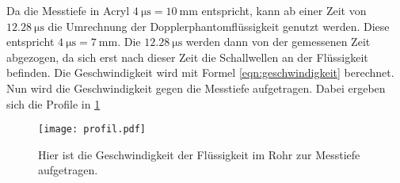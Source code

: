 Da die Messtiefe in Acryl $\qty{4}{\micro\second}=\qty{10}{\milli\meter}$ entspricht, kann ab einer Zeit von $\qty{12.28}{\micro\second}$ die Umrechnung der Dopplerphantomflüssigkeit genutzt werden.
Diese entspricht $\qty{4}{\micro\second}=\qty{7}{\milli\meter}$.
Die $\qty{12.28}{\micro\second}$ werden dann von der gemessenen Zeit abgezogen, da sich erst nach dieser Zeit die Schallwellen an der Flüssigkeit befinden.
Die Geschwindigkeit wird mit Formel \ref{eqn:geschwindigkeit} berechnet.
Nun wird die Geschwindigkeit gegen die Messtiefe aufgetragen.
Dabei ergeben sich die Profile in \ref{fig:Profile}
\begin{figure}
  \centering
  \texttt{[image: profil.pdf]}
  \caption{Hier ist die Geschwindigkeit der Flüssigkeit im Rohr zur Messtiefe aufgetragen.}
  \label{fig:Profile}
\end{figure}